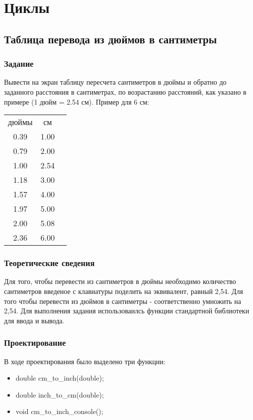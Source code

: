 \documentclass[12pt,a4paper]{report}
\begin{document}
\chapter{Циклы}
\section{Таблица перевода из дюймов в сантиметры}
\subsection{Задание}
\hspace{\parindent}
Вывести на экран таблицу пересчета сантиметров в дюймы и обратно до заданного расстояния в сантиметрах, по возрастанию расстояний, как указано в примере (1 дюйм = 2.54 см). Пример для 6 см:
	
\begin{center}
\begin{tabular}{ccc}
	дюймы  &  см \\
	0.39 &  1.00 \\
	0.79 &  2.00 \\
	1.00 &  2.54 \\
	1.18 &  3.00 \\
	1.57 &  4.00 \\
	1.97 &  5.00 \\
	2.00 &  5.08 \\
	2.36 &  6.00\\
\end{tabular}
\end{center}	
	
\subsection{Теоретические сведения}
\hspace{\parindent}
Для того, чтобы перевести из сантиметров в дюймы необходимо количество сантиметров введеное с клавиатуры поделить на эквивалент, равный 2,54. Для того чтобы перевести из дюймов в сантиметры - соответственно умножить на 2,54.
	Для выполнения задания использоваилсь функции стандартной библиотеки для ввода и вывода.
	
\subsection{Проектирование}
\hspace{\parindent}
В ходе проектирования было выделено три функции:

\begin{itemize}
\item double cm\_to\_inch(double);
\item double inch\_to\_cm(double);
\item void cm\_to\_inch\_console();
\end{itemize}
\end{document}
